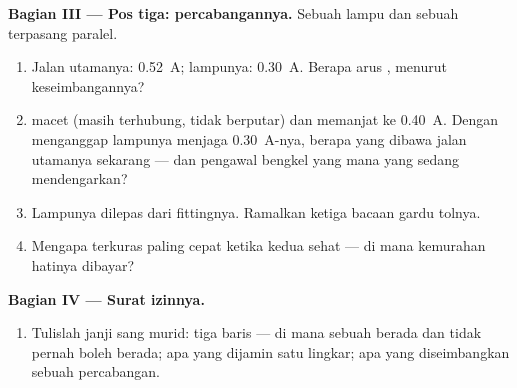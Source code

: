 \begin{problem}
\medskip\noindent\textbf{Bagian III --- Pos tiga:
percabangannya.}
Sebuah  lampu dan sebuah   terpasang paralel.
\begin{enumerate}[resume]
  \item Jalan utamanya: \qty{0.52}{A};  lampunya: \qty{0.30}{A}.
        Berapa arus  , menurut keseimbangannya?
  \item {} macet (masih terhubung, tidak berputar) dan
         memanjat ke \qty{0.40}{A}. Dengan menganggap 
        lampunya menjaga \qty{0.30}{A}-nya, berapa yang dibawa jalan
        utamanya sekarang --- dan pengawal bengkel yang mana yang
        sedang mendengarkan?
  \item Lampunya dilepas dari fittingnya. Ramalkan ketiga bacaan
        gardu tolnya.
  \item Mengapa  terkuras paling cepat ketika kedua
         sehat --- di mana kemurahan hatinya dibayar?
\end{enumerate}

\medskip\noindent\textbf{Bagian IV --- Surat izinnya.}
\begin{enumerate}[resume]
  \item Tulislah janji sang murid: tiga baris --- di mana sebuah
         berada dan tidak pernah boleh berada; apa yang
        dijamin satu lingkar; apa yang diseimbangkan sebuah
        percabangan.
\end{enumerate}
\end{problem}
